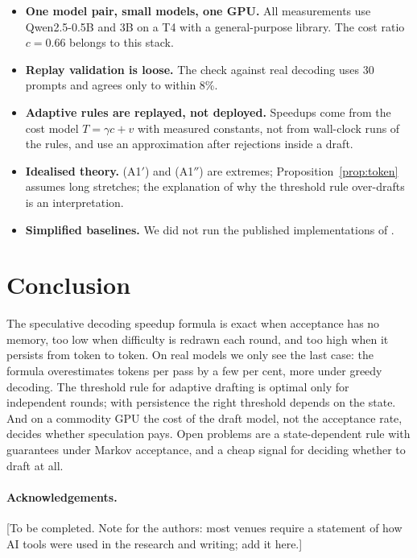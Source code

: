 \documentclass[10pt]{article}
\theoremstyle{remark}
\begin{document}
\begin{itemize}\setlength{\itemsep}{0pt}
\item \textbf{One model pair, small models, one GPU.} All measurements use Qwen2.5-0.5B and 3B on a T4 with a
general-purpose library. The cost ratio $c=0.66$ belongs to this stack.
\item \textbf{Replay validation is loose.} The check against real decoding uses 30 prompts and agrees only to
within 8\%.
\item \textbf{Adaptive rules are replayed, not deployed.} Speedups come from the cost model $T=\gamma c+v$ with
measured constants, not from wall-clock runs of the rules, and use an approximation after rejections inside a draft.
\item \textbf{Idealised theory.} (A1$'$) and (A1$''$) are extremes; Proposition~\ref{prop:token} assumes long
stretches; the explanation of why the threshold rule over-drafts is an interpretation.
\item \textbf{Simplified baselines.} We did not run the published implementations of \cite{disco,specdecpp}.
\end{itemize}

\section{Conclusion}

The speculative decoding speedup formula is exact when acceptance has no memory, too low when difficulty is redrawn
each round, and too high when it persists from token to token. On real models we only see the last case: the
formula overestimates tokens per pass by a few per cent, more under greedy decoding. The threshold rule for adaptive
drafting is optimal only for independent rounds; with persistence the right threshold depends on the state. And on
a commodity GPU the cost of the draft model, not the acceptance rate, decides whether speculation pays. Open
problems are a state-dependent rule with guarantees under Markov acceptance, and a cheap signal for deciding
whether to draft at all.

\paragraph{Acknowledgements.} [To be completed. Note for the authors: most venues require a statement of how AI
tools were used in the research and writing; add it here.]
\end{document}

